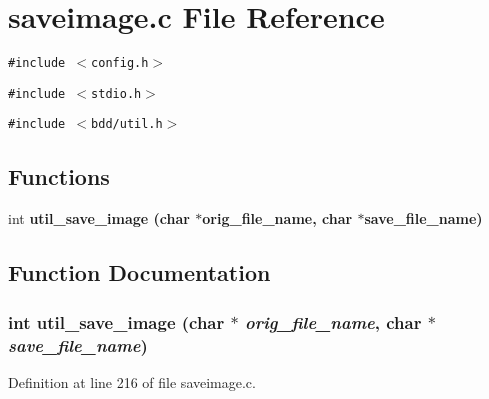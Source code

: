 \section{saveimage.c File Reference}
\label{saveimage_8c}
{\tt \#include $<$config.h$>$}\par
{\tt \#include $<$stdio.h$>$}\par
{\tt \#include $<$bdd/util.h$>$}\par
\subsection*{Functions}
\begin{CompactItemize}
\item 
int \bf{util\_\-save\_\-image} (char $\ast$orig\_\-file\_\-name, char $\ast$save\_\-file\_\-name)
\end{CompactItemize}


\subsection{Function Documentation}
\subsubsection{\setlength{\rightskip}{0pt plus 5cm}int util\_\-save\_\-image (char $\ast$ {\em orig\_\-file\_\-name}, char $\ast$ {\em save\_\-file\_\-name})}\label{saveimage_8c_277fb5a619be1caf67318e09454d874d}




Definition at line 216 of file saveimage.c.